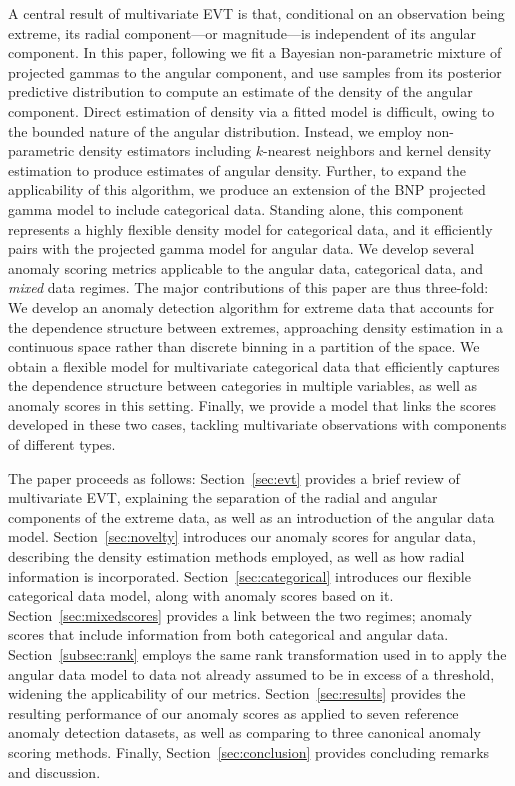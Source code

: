 A central result of multivariate EVT is that, conditional on an observation 
    being extreme, its radial component---or magnitude---is independent of its 
    angular component.  In this paper, following \cite{trubey:pg}
    we fit a Bayesian non-parametric mixture 
    of projected gammas to the angular component, and use samples from its 
    posterior predictive distribution to compute an estimate of the density 
    of the angular component.   Direct estimation of density via a fitted model
    is difficult, owing to the bounded nature of the angular distribution.  
    Instead, we employ non-parametric density estimators including $k$-nearest 
    neighbors and kernel density estimation to produce estimates of angular 
    density.  Further, to expand the applicability of this algorithm, we 
    produce an extension of the BNP projected gamma model to include categorical 
    data.   Standing alone, this component represents a highly flexible density 
    model for categorical data, and it efficiently pairs with the projected 
    gamma model for angular data.  We develop several anomaly scoring metrics 
    applicable to the angular data, categorical data, and \emph{mixed} data 
    regimes.  The major contributions of this paper are thus three-fold: We 
    develop an anomaly detection algorithm for extreme data that accounts for 
    the dependence structure between extremes, approaching density estimation 
    in a continuous space  rather than discrete binning in a partition of the 
    space. We obtain a flexible model for multivariate categorical data that 
    efficiently captures the dependence structure between categories in multiple 
    variables, as well as anomaly scores in this setting. Finally, we 
    provide a model that links the scores developed in these two cases, tackling
    multivariate observations with components of different types.

The paper proceeds as follows: Section~\ref{sec:evt} provides a 
    brief review of multivariate EVT, explaining the separation of the radial 
    and angular components of the extreme data, as well as an introduction of 
    the angular data model.  Section~\ref{sec:novelty} introduces our anomaly 
    scores for angular data, describing the density estimation methods employed, 
    as well as how radial information is incorporated.  
    Section~\ref{sec:categorical} introduces our flexible categorical data 
    model, along with anomaly scores based on it. 
    Section~\ref{sec:mixedscores} provides a link between the two regimes; 
    anomaly scores that include information from both categorical and angular 
    data.  
    Section~\ref{subsec:rank} employs the same rank transformation used in 
    \cite{goix2017} to apply the angular data model to data not already assumed 
    to be in excess of a threshold, widening the applicability of our metrics.
    Section~\ref{sec:results} provides the resulting performance of our anomaly 
    scores as applied to seven reference anomaly detection datasets, as well as 
    comparing to three canonical anomaly scoring methods.  
    Finally, Section~\ref{sec:conclusion} provides concluding remarks and discussion.

